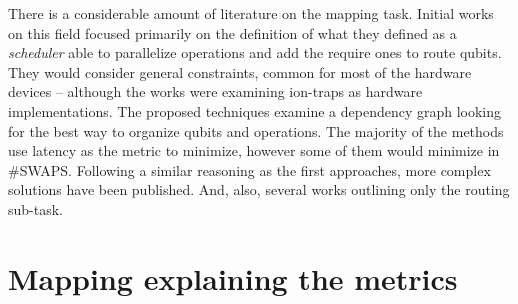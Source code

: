 There is a considerable amount of literature on the mapping task.
Initial works on this field \cite{Metodi_2006,Whitney_2007,Bahreini_2015} focused primarily on the definition of what they defined as a \emph{scheduler} able to parallelize operations and add the require ones to route qubits.
They would consider general constraints, common for most of the hardware devices -- although the works were examining ion-traps as hardware implementations.
The proposed techniques examine a dependency graph looking for the best way to organize qubits and operations.
The majority of the methods use latency as the metric to minimize, however some of them \cite{Farghadan_2017} would minimize in \#SWAPS.
Following a similar reasoning as the first approaches, more complex solutions \cite{booth18:compar_integ_const_progr_tempor} have been published.
And, also, several works \cite{Lye_2015,Wille_2016} outlining only the routing sub-task. 




\section*{Mapping explaining the metrics}
\label{sec:orgde98bfc}
